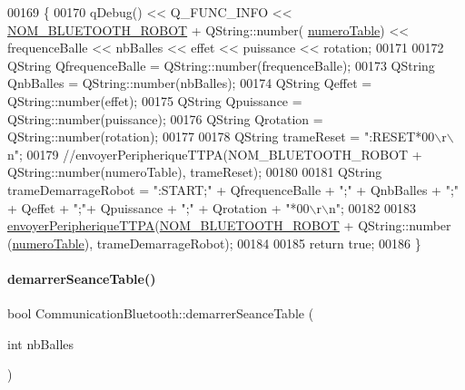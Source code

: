 \begin{DoxyCode}
00169 \{
00170     qDebug() << Q\_FUNC\_INFO << \hyperlink{terminal-_t_t_p_a_2communicationbluetooth_8h_a47332bb9b30ed8b0f38fa7b5bd11fd47}{NOM\_BLUETOOTH\_ROBOT} + QString::number(
      \hyperlink{class_communication_bluetooth_a9428f8261f0cc055e9c6fed9a61cb595}{numeroTable}) << frequenceBalle << nbBalles << effet << puissance << rotation;
00171 
00172     QString QfrequenceBalle = QString::number(frequenceBalle);
00173     QString QnbBalles = QString::number(nbBalles);
00174     QString Qeffet = QString::number(effet);
00175     QString Qpuissance = QString::number(puissance);
00176     QString Qrotation = QString::number(rotation);
00177 
00178     QString trameReset = \textcolor{stringliteral}{":RESET*00\(\backslash\)r\(\backslash\)n"};
00179     \textcolor{comment}{//envoyerPeripheriqueTTPA(NOM\_BLUETOOTH\_ROBOT + QString::number(numeroTable), trameReset);}
00180 
00181     QString trameDemarrageRobot = \textcolor{stringliteral}{":START;"} + QfrequenceBalle + \textcolor{stringliteral}{";"} + QnbBalles + \textcolor{stringliteral}{";"} + Qeffet + \textcolor{stringliteral}{";"}+ 
      Qpuissance + \textcolor{stringliteral}{";"} + Qrotation + \textcolor{stringliteral}{"*00\(\backslash\)r\(\backslash\)n"};
00182 
00183     \hyperlink{class_communication_bluetooth_a73d95b841bf64a4463760435a41fc219}{envoyerPeripheriqueTTPA}(\hyperlink{terminal-_t_t_p_a_2communicationbluetooth_8h_a47332bb9b30ed8b0f38fa7b5bd11fd47}{NOM\_BLUETOOTH\_ROBOT} + QString::number
      (\hyperlink{class_communication_bluetooth_a9428f8261f0cc055e9c6fed9a61cb595}{numeroTable}), trameDemarrageRobot);
00184 
00185     \textcolor{keywordflow}{return} \textcolor{keyword}{true};
00186 \}
\end{DoxyCode}
\mbox{\label{class_communication_bluetooth_abb71c8f555c64d1791d330955ace417c}} 
\paragraph{\texorpdfstring{demarrer\+Seance\+Table()}{demarrerSeanceTable()}}
{\footnotesize\ttfamily bool Communication\+Bluetooth\+::demarrer\+Seance\+Table (\begin{DoxyParamCaption}\item[{int}]{nb\+Balles }\end{DoxyParamCaption})}


